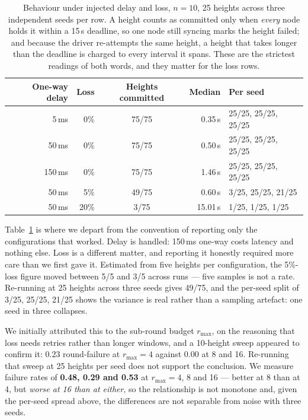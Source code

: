 \documentclass{llncs}
\begin{document}
\begin{table}[t]
\centering
\caption{Behaviour under injected delay and loss, $n=10$, 25 heights across
three independent seeds per row. A height counts as committed only when
\emph{every} node holds it within a 15\,s deadline, so one node still syncing
marks the height failed; and because the driver re-attempts the same height, a
height that takes longer than the deadline is charged to every interval it
spans. These are the strictest readings of both words, and they matter for the
loss rows.}
\label{tab:adversity}
\begin{tabular}{rrcrl}
\toprule
\textbf{One-way delay} & \textbf{Loss} & \textbf{Heights committed} &
\textbf{Median} & \textbf{Per seed} \\
\midrule
5\,ms   & 0\%  & 75/75 & 0.35\,s  & 25/25, 25/25, 25/25 \\
50\,ms  & 0\%  & 75/75 & 0.50\,s  & 25/25, 25/25, 25/25 \\
150\,ms & 0\%  & 75/75 & 1.46\,s  & 25/25, 25/25, 25/25 \\
50\,ms  & 5\%  & 49/75 & 0.60\,s  & 3/25, 25/25, 21/25 \\
50\,ms  & 20\% & 3/75 & 15.01\,s & 1/25, 1/25, 1/25 \\
\bottomrule
\end{tabular}
\end{table}

Table~\ref{tab:adversity} is where we depart from the convention of reporting
only the configurations that worked. Delay is handled: 150\,ms
one-way costs latency and nothing else. Loss is a different matter, and reporting
it honestly required more care than we first gave it. Estimated from five
heights per configuration, the 5\%-loss figure moved between 5/5 and
3/5 across runs --- five samples is not a rate. Re-running at 25 heights across
three seeds gives 49/75, and the per-seed split of 3/25, 25/25, 21/25 shows the
variance is real rather than a sampling artefact: one seed in three collapses.

We initially attributed this to the sub-round budget $r_{\max}$, on the
reasoning that loss needs retries rather than longer windows, and a 10-height
sweep appeared to confirm it: 0.23 round-failure at $r_{\max} = 4$ against 0.00
at 8 and 16. Re-running that sweep at 25 heights per seed does not support the
conclusion. We measure failure rates of \textbf{0.48, 0.29 and 0.53} at
$r_{\max} = 4$, 8 and 16 --- better at 8 than at 4, but \emph{worse at 16 than
at either}, so the relationship is not monotone and, given the per-seed spread
above, the differences are not separable from noise with three seeds.
\end{document}
